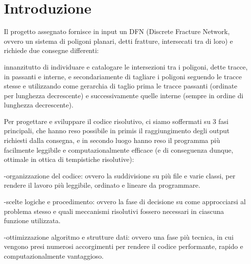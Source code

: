 \documentclass[a4paper,12pt]{report}
\begin{document}
\chapter*{Introduzione}
Il progetto assegnato fornisce in input un DFN (Discrete Fracture Network, ovvero un sistema di poligoni planari, detti fratture, intersecati tra di loro) e richiede due consegne differenti:

innanzitutto di individuare e catalogare le intersezioni tra i poligoni, dette tracce, in passanti e interne, e secondariamente di tagliare i poligoni seguendo le tracce stesse e utilizzando come gerarchia di taglio prima le tracce passanti (ordinate per lunghezza decrescente) e successivamente quelle interne (sempre in ordine di lunghezza decrescente).


Per progettare e sviluppare il codice risolutivo, ci siamo soffermati su 3 fasi principali, che hanno reso possibile in primis il raggiungimento degli output richiesti dalla consegna, e in secondo luogo hanno reso il programma più facilmente leggibile e computazionalmente efficace (e di conseguenza dunque, ottimale in ottica di tempistiche risolutive):

-organizzazione del codice: ovvero la suddivisione su più file e varie classi, per rendere il lavoro più leggibile, ordinato e lineare da programmare.

-scelte logiche e procedimento: ovvero la fase di decisione su come approcciarsi al problema stesso e quali meccanismi risolutivi fossero necessari in ciascuna funzione utilizzata.

-ottimizzazione algoritmo e strutture dati: ovvero una fase più tecnica, in cui vengono presi numerosi accorgimenti per rendere il codice performante, rapido e computazionalmente vantaggioso.


\tableofcontents


\end{document}
